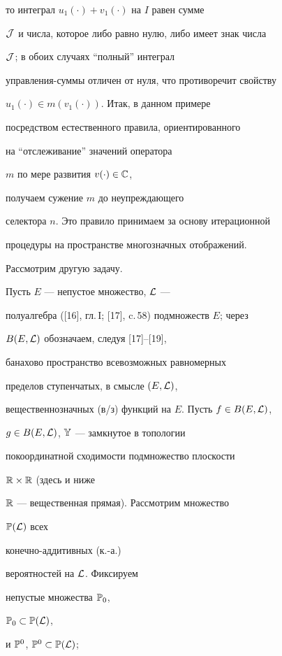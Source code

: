 то интеграл ${u_1}(\cdot) + {v_1}(\cdot)$ на $I$ равен сумме


${\cal J}$ и числа, которое либо равно нулю, либо имеет знак числа


${\cal J}$; в обоих случаях ``полный'' интеграл


управления-суммы отличен от нуля, что противоречит свойству


${u_1}(\cdot) \in m({v_1}(\cdot))$. Итак, в данном примере


посредством естественного правила, ориентированного


на ``отслеживание'' значений оператора


$m$ по мере развития $v(\cdot) \in {\Bbb C}$,


получаем сужение $m$ до неупреждающего


селектора $n$. Это правило принимаем за основу итерационной


процедуры на пространстве многозначных отображений.





Рассмотрим другую задачу.


Пусть $E$ --- непустое множество, ${\cal L}$ ---


полуалгебра ([16], гл.\,I; [17], c.\,58) подмножеств $E$; через


$B(E,{\cal L})$ обозначаем, следуя [17]--[19],


банахово пространство всевозможных равномерных


пределов ступенчатых, в смысле $(E,{\cal L})$,


вещественнозначных (в/з) функций на $E$. Пусть $f \in B(E,{\cal L})$,


$g \in B(E,{\cal L})$, ${\Bbb Y}$ --- замкнутое в топологии


покоординатной сходимости подмножество плоскости


${\Bbb R} \times {\Bbb R}$ (здесь и ниже


${\Bbb R}$ --- вещественная прямая). Рассмотрим множество


${\Bbb P}({\cal L})$ всех


конечно-аддитивных (к.-а.)


вероятностей на ${\cal L}$. Фиксируем


непустые множества ${{\Bbb P}_0}$,


${{\Bbb P}_0} \subset {{\Bbb P}({\cal L})}$,


и ${{\Bbb P}^0}$, ${{\Bbb P}^0} \subset {{\Bbb P}({\cal L})}$;


